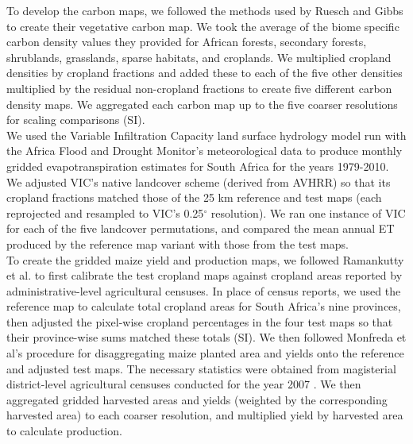 \documentclass{pnastwo}
\begin{document}
\begin{article}
\begin{materials}
\indent To develop the carbon maps, we followed the methods used by Ruesch and Gibbs \cite{ruesch_new_2008} to create their vegetative carbon map. We took the average of the biome specific carbon density values they provided for African forests, secondary forests, shrublands, grasslands, sparse habitats, and croplands. We multiplied cropland densities by cropland fractions and added these to each of the five other densities multiplied by the residual non-cropland fractions to create five different carbon density maps. We aggregated each carbon map up to the five coarser resolutions for scaling comparisons (SI).  \\
\indent We used the Variable Infiltration Capacity \cite{liang_simple_1994} land surface hydrology model run with the Africa Flood and Drought Monitor's meteorological data \cite{sheffield_drought_2013} to produce monthly gridded evapotranspiration estimates for South Africa for the years 1979-2010. We adjusted VIC's native landcover scheme (derived from AVHRR) so that its cropland fractions matched those of the 25 km reference and test maps (each reprojected and resampled to VIC's 0.25$^{\circ}$ resolution). We ran one instance of VIC for each of the five landcover permutations, and compared the mean annual ET produced by the reference map variant with those from the test maps. \\
\indent To create the gridded maize yield and production maps, we followed Ramankutty et al. \cite{ramankutty_farming_2008} to first calibrate the test cropland maps against cropland areas reported by administrative-level agricultural censuses. In place of census reports, we used the reference map to calculate total cropland areas for South Africa's nine provinces, then adjusted the pixel-wise cropland percentages in the four test maps so that their province-wise sums matched these totals (SI). We then followed Monfreda et al's procedure \cite{monfreda_farming_2008} for disaggregating maize \cite[South Africa's largest crop][]{estes_comparing_2013} planted area and yields onto the reference and adjusted test maps. The necessary statistics were obtained from magisterial district-level agricultural censuses conducted for the year 2007 \cite{statistics_south_africa_commercial_2007}. We then aggregated gridded harvested areas and yields (weighted by the corresponding harvested area) to each coarser resolution, and multiplied yield by harvested area to calculate production.\\

\end{materials}
\end{article}
\end{document}
